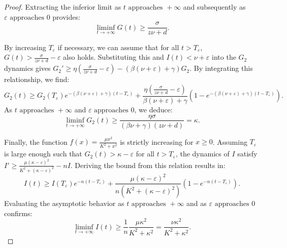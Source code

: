 \documentclass[a4paper,fleqn]{cas-sc}
\numberwithin{equation}{section}
\numberwithin{equation}{section}
\newcommand{\1}{\boldsymbol{1}}
\newcommand{\0}{\boldsymbol{0}}
\begin{document}
\begin{proof}
    Extracting the inferior limit as $t \text{ approaches } +\infty$ and subsequently as $\varepsilon \text{ approaches } 0$ provides:
    \[
        \liminf_{t \to +\infty} G(t) \geq \frac{\sigma}{z\nu+d}.
    \]
    
    By increasing $T_\varepsilon$ if necessary, we can assume that for all $t > T_\varepsilon$, $G(t) > \frac{\sigma}{z\nu+d} - \varepsilon$ also holds. Substituting this and $I(t) < \nu + \varepsilon$ into the $G_2$ dynamics gives $G_2' \geq \eta \left( \frac{\sigma}{z\nu+d} - \varepsilon \right) - (\beta(\nu + \varepsilon) + \gamma)G_2$. By integrating this relationship, we find:
    \[
        G_2(t) \geq G_2(T_\varepsilon)e^{-(\beta(\nu + \varepsilon) + \gamma)(t-T_\varepsilon)} + \frac{\eta \left( \frac{\sigma}{z\nu+d} - \varepsilon \right)}{\beta(\nu + \varepsilon) + \gamma}\left(1 - e^{-(\beta(\nu + \varepsilon) + \gamma)(t-T_\varepsilon)}\right).
    \]
    As $t \text{ approaches } +\infty$ and $\varepsilon \text{ approaches } 0$, we deduce:
    \[
        \liminf_{t \to +\infty} G_2(t) \geq \frac{\eta\sigma}{(\beta \nu + \gamma)(z\nu + d)} = \kappa.
    \]
    
    Finally, the function $f(x) = \frac{\mu x^2}{K^2+x^2}$ is strictly increasing for $x \geq 0$. Assuming $T_\varepsilon$ is large enough such that $G_2(t) > \kappa - \varepsilon$ for all $t > T_\varepsilon$, the dynamics of $I$ satisfy $I' \geq \frac{\mu(\kappa-\varepsilon)^2}{K^2+(\kappa-\varepsilon)^2} - nI$. Deriving the bound from this relation results in:
    \[
        I(t) \geq I(T_\varepsilon)e^{-n(t-T_\varepsilon)} + \frac{\mu(\kappa-\varepsilon)^2}{n(K^2+(\kappa-\varepsilon)^2)}\left(1 - e^{-n(t-T_\varepsilon)}\right).
    \]
    Evaluating the asymptotic behavior as $t \text{ approaches } +\infty$ and as $\varepsilon \text{ approaches } 0$ confirms:
    \[
        \liminf_{t \to +\infty} I(t) \geq \frac{1}{n} \frac{\mu\kappa^2}{K^2+\kappa^2} = \frac{\nu\kappa^2}{K^2+\kappa^2}.
    \]
\end{proof}
\end{document}
